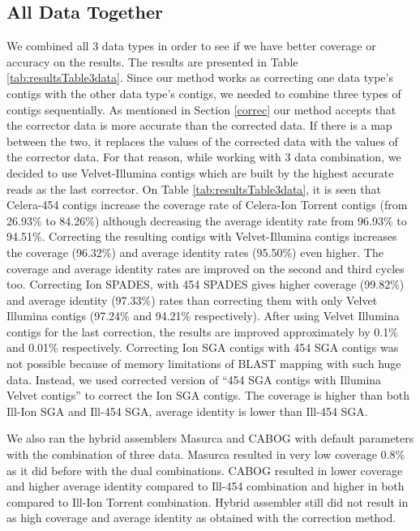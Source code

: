 \documentclass{llncs}
\begin{document}
\subsection{All Data Together}
\label{3data}
We combined all 3 data types in order to see if we have better coverage or accuracy on the results. The results are presented in Table \ref{tab:resultsTable3data}. Since our method works as correcting one data type's contigs with the other data type's contigs, we needed to combine three types of contigs sequentially. As mentioned in Section \ref{correc} our method accepts that the corrector data is more accurate than the corrected data. If there is a map between the two, it replaces the values of the corrected data with the values of the corrector data. For that reason, while working with 3 data combination, we decided to use Velvet-Illumina contigs which are built by the highest accurate reads as the last corrector. On Table \ref{tab:resultsTable3data}, it is seen that Celera-454 contigs increase the coverage rate of Celera-Ion Torrent contigs (from 26.93\% to 84.26\%) although decreasing the average identity rate from 96.93\% to 94.51\%. Correcting the resulting contigs with Velvet-Illumina contigs increases the coverage (96.32\%) and average identity rates (95.50\%) even higher. The coverage and average identity rates are improved on the second and third cycles too. Correcting Ion SPADES, with 454 SPADES gives higher coverage (99.82\%) and average identity (97.33\%) rates than correcting them with only Velvet Illumina contigs (97.24\% and 94.21\% respectively). After using Velvet Illumina contigs for the last correction, the results are improved approximately by 0.1\% and 0.01\% respectively. Correcting Ion SGA contigs with 454 SGA contigs was not possible because of memory limitations of BLAST mapping with such huge data. Instead, we used corrected version of ``454 SGA contigs with Illumina Velvet contigs'' to correct the Ion SGA contigs. The coverage is higher than both Ill-Ion SGA and Ill-454 SGA, average identity is lower than Ill-454 SGA. 

We also ran the hybrid assemblers Masurca and CABOG with default parameters with the combination of three data. Masurca resulted in very low coverage 0.8\% as it did before with the dual combinations. CABOG resulted in lower coverage and higher average identity compared to Ill-454 combination and higher in both compared to Ill-Ion Torrent combination. Hybrid assembler still did not result in as high coverage and average identity as obtained with the correction method.
\end{document}

